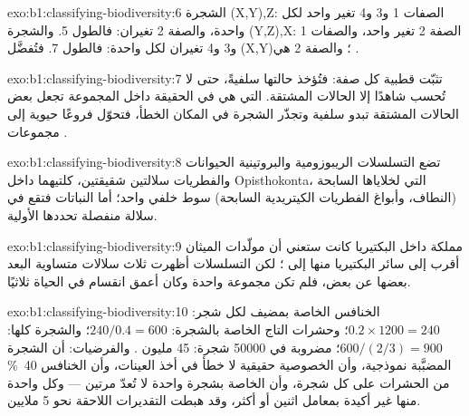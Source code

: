 \begin{solution}{exo:b1:classifying-biodiversity:6}
الشجرة (X,Y),Z: الصفات 1 و3 و4 تغير واحد لكل واحدة، والصفة 2 تغيران:
فالطول 5. والشجرة (Y,Z),X: الصفة 2 تغير واحد، والصفات
1 و3 و4 تغيران لكل واحدة: فالطول 7. فتُفضَّل (X,Y)؛ والصفة 2 هي
.
\end{solution}

\begin{solution}{exo:b1:classifying-biodiversity:7}
تثبّت  قطبية كل صفة: فتُؤخذ حالتها
سلفيةً، حتى لا تُحسب شاهدًا إلا الحالات المشتقة.
 التي هي في الحقيقة داخل المجموعة تجعل بعض
الحالات المشتقة تبدو سلفية وتجذّر الشجرة في المكان الخطأ،
فتحوّل فروعًا حيوية إلى مجموعات .
\end{solution}

\begin{solution}{exo:b1:classifying-biodiversity:8}
تضع التسلسلات الريبوزومية والبروتينية الحيوانات والفطريات سلالتين
شقيقتين، كلتيهما داخل Opisthokonta، التي لخلاياها السابحة
(النطاف، وأبواغ الفطريات الكيتريدية السابحة) سوط خلفي واحد؛ أما النباتات
فتقع في سلالة منفصلة تحددها  الأولية.
\end{solution}

\begin{solution}{exo:b1:classifying-biodiversity:9}
مملكة داخل البكتيريا كانت ستعني أن مولّدات الميثان أقرب
إلى سائر البكتيريا منها إلى ؛ لكن التسلسلات أظهرت ثلاث
سلالات متساوية البعد بعضها عن بعض، فلم تكن 
مجموعة واحدة وكان أعمق انقسام في الحياة ثلاثيًا.
\end{solution}

\begin{solution}{exo:b1:classifying-biodiversity:10}
الخنافس الخاصة بمضيف لكل  شجر: $0.2\times 1200 = 240$؛
وحشرات التاج الخاصة بالشجرة: $240/0.4 = 600$؛ والشجرة كلها:
$600/(2/3) = 900$؛ مضروبة في \num{50000} شجرة: \num{45} مليون .
والفرضيات: أن الشجرة المضبَّبة نموذجية، وأن الخصوصية حقيقية
لا خطأ في أخذ العينات، وأن الخنافس \qty{40}{\%} من الحشرات على كل
شجرة، وأن  الخاصة بشجرة واحدة لا تُعدّ مرتين ---
وكل واحدة منها غير أكيدة بمعامل اثنين أو أكثر، وقد هبطت التقديرات
اللاحقة نحو \num{5} ملايين.
\end{solution}

